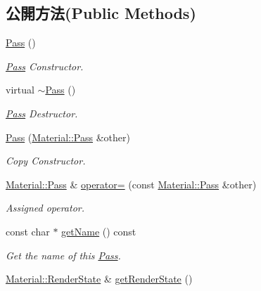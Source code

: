 \subsection*{公開方法(Public Methods)}
\begin{DoxyCompactItemize}
\item 
\hyperlink{class_i_dream_sky_1_1_material_1_1_pass_acb73e4580b0eeec0d51c144ab33b7616}{Pass} ()
\begin{DoxyCompactList}\small\item\em \hyperlink{class_i_dream_sky_1_1_material_1_1_pass}{Pass} Constructor. \end{DoxyCompactList}\item 
virtual \hyperlink{class_i_dream_sky_1_1_material_1_1_pass_a8c351b64488af5bd772601b6e69d14fd}{$\sim$\+Pass} ()
\begin{DoxyCompactList}\small\item\em \hyperlink{class_i_dream_sky_1_1_material_1_1_pass}{Pass} Destructor. \end{DoxyCompactList}\item 
\hyperlink{class_i_dream_sky_1_1_material_1_1_pass_a235855b54aa05362e3d622681af51104}{Pass} (\hyperlink{class_i_dream_sky_1_1_material_1_1_pass}{Material\+::\+Pass} \&other)
\begin{DoxyCompactList}\small\item\em Copy Constructor. \end{DoxyCompactList}\item 
\hyperlink{class_i_dream_sky_1_1_material_1_1_pass}{Material\+::\+Pass} \& \hyperlink{class_i_dream_sky_1_1_material_1_1_pass_a34cc97c15834661bb7266c3147265f7d}{operator=} (const \hyperlink{class_i_dream_sky_1_1_material_1_1_pass}{Material\+::\+Pass} \&other)
\begin{DoxyCompactList}\small\item\em Assigned operator. \end{DoxyCompactList}\item 
const char $\ast$ \hyperlink{class_i_dream_sky_1_1_material_1_1_pass_a56a4219ed3f8d2a1cc6f4ecb6e28c691}{get\+Name} () const 
\begin{DoxyCompactList}\small\item\em Get the name of this \hyperlink{class_i_dream_sky_1_1_material_1_1_pass}{Pass}. \end{DoxyCompactList}\item 
\hyperlink{class_i_dream_sky_1_1_material_1_1_render_state}{Material\+::\+Render\+State} \& \hyperlink{class_i_dream_sky_1_1_material_1_1_pass_a4a412323035eacfe58026b5073d0f8b4}{get\+Render\+State} ()

\end{DoxyCompactItemize}
